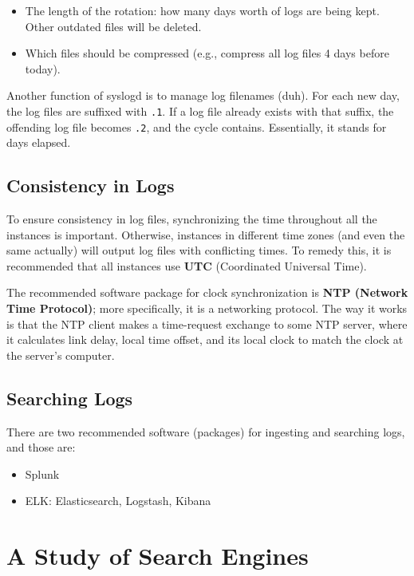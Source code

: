 \documentclass{report}
\newcommand{\npar}{\par\noindent}
\newcommand{\vpar}{\vspace{1em}\npar}
\begin{document}
\begin{itemize}
    \item The length of the rotation: how many days worth of logs are being kept. Other outdated files will be deleted.
    \item Which files should be compressed (e.g., compress all log files 4 days before today).
\end{itemize}

\npar Another function of syslogd is to manage log filenames (duh). For each new day, the log files are suffixed with \verb|.1|. If a log file already exists with that suffix, the offending log file becomes \verb|.2|, and the cycle contains. Essentially, it stands for days elapsed.

\section{Consistency in Logs}

\par To ensure consistency in log files, synchronizing the time throughout all the instances is important. Otherwise, instances in different time zones (and even the same actually) will output log files with conflicting times. To remedy this, it is recommended that all instances use \textbf{UTC} (Coordinated Universal Time).

\vpar The recommended software package for clock synchronization is \textbf{NTP (Network Time Protocol)}; more specifically, it is a networking protocol. The way it works is that the NTP client makes a time-request exchange to some NTP server, where it calculates link delay, local time offset, and its local clock to match the clock at the server's computer.

\section{Searching Logs}

\par There are two recommended software (packages) for ingesting and searching logs, and those are:

\begin{itemize}
    \item Splunk
    \item ELK: Elasticsearch, Logstash, Kibana
\end{itemize}

\chapter{A Study of Search Engines}
\end{document}
